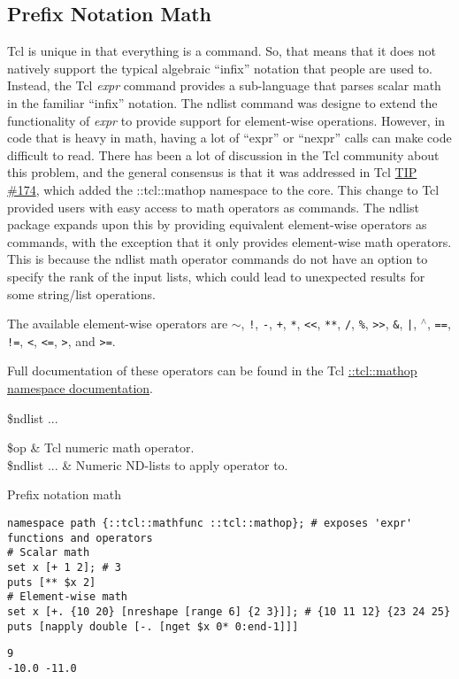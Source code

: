 \clearpage
\subsection{Prefix Notation Math}
Tcl is unique in that everything is a command. So, that means that it does not natively support the typical algebraic ``infix'' notation that people are used to. 
Instead, the Tcl \textit{expr} command provides a sub-language that parses scalar math in the familiar ``infix'' notation.
The ndlist  command was designe to extend the functionality of \textit{expr} to provide support for element-wise operations. 
However, in code that is heavy in math, having a lot of ``expr'' or ``nexpr'' calls can make code difficult to read.
There has been a lot of discussion in the Tcl community about this problem, and the general consensus is that it was addressed in Tcl \hyperlink{https://core.tcl-lang.org/tips/doc/trunk/tip/174.md}{TIP \#174}, which added the ::tcl::mathop namespace to the core. 
This change to Tcl provided users with easy access to math operators as commands.
The ndlist package expands upon this by providing equivalent element-wise operators as commands, with the exception that it only provides element-wise math operators. 
This is because the ndlist math operator commands do not have an option to specify the rank of the input lists, which could lead to unexpected results for some string/list operations.

The available element-wise operators are \texttt{$\sim$}, \texttt{!}, \texttt{-}, \texttt{+}, \texttt{*}, \texttt{<{}<}, \texttt{**}, \texttt{/}, \texttt{\%}, \texttt{>{}>}, \texttt{\&}, \texttt{|}, \texttt{$^\wedge$}, \texttt{==}, \texttt{!=}, \texttt{<}, \texttt{<=}, \texttt{>}, and \texttt{>=}. 

Full documentation of these operators can be found in the Tcl \hyperlink{https://www.tcl-lang.org/man/tcl/TclCmd/mathop.htm}{::tcl::mathop namespace documentation}.

\begin{syntax}
 \$ndlist ...
\end{syntax}
\begin{args}
\$op & Tcl numeric math operator. \\
\$ndlist ... & Numeric ND-lists to apply operator to.
\end{args}

\begin{example}{Prefix notation math}
\begin{lstlisting}
namespace path {::tcl::mathfunc ::tcl::mathop}; # exposes 'expr' functions and operators
# Scalar math
set x [+ 1 2]; # 3
puts [** $x 2]
# Element-wise math
set x [+. {10 20} [nreshape [range 6] {2 3}]]; # {10 11 12} {23 24 25}
puts [napply double [-. [nget $x 0* 0:end-1]]]
\end{lstlisting}
\tcblower
\begin{lstlisting}
9
-10.0 -11.0
\end{lstlisting}
\end{example}

\clearpage